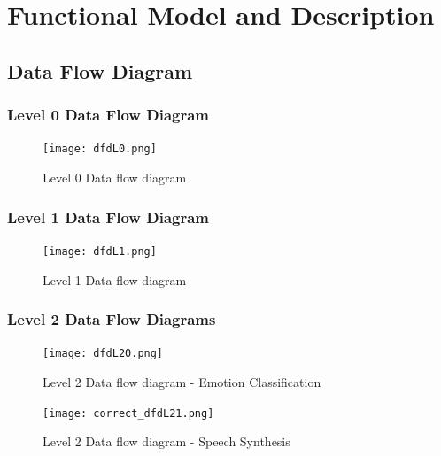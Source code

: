 \documentclass[oneside,a4paper,12pt]{book}
\begin{document}
 
\section{Functional Model and Description}  

\subsection{Data Flow Diagram}
	\subsubsection{Level 0 Data Flow Diagram}
\begin{center}
	\begin{figure}[!htbp]
		\centering
		\texttt{[image: dfdL0.png]}
		\caption{Level 0 Data flow diagram}
		\label{fig:dfdl0-dig}
	\end{figure}
\end{center}

	\subsubsection{Level 1 Data Flow Diagram}
\begin{center}
	\begin{figure}[!htbp]
		\centering
		\texttt{[image: dfdL1.png]}
		\caption{Level 1 Data flow diagram}
		\label{fig:dfdl1-dig}
	\end{figure}
\end{center}

\subsubsection{Level 2 Data Flow Diagrams}
\begin{center}
	\begin{figure}[!htbp]
		\centering
		\texttt{[image: dfdL20.png]}
		\caption{Level 2 Data flow diagram - Emotion Classification}
		\label{fig:dfdl20-dig}
	\end{figure}
\end{center}

\begin{center}
	\begin{figure}[!htbp]
		\centering
		\texttt{[image: correct\_dfdL21.png]}
		\caption{Level 2 Data flow diagram - Speech Synthesis}
		\label{fig:dfdl21-dig}
	\end{figure}
\end{center}

\newpage
\end{document}
